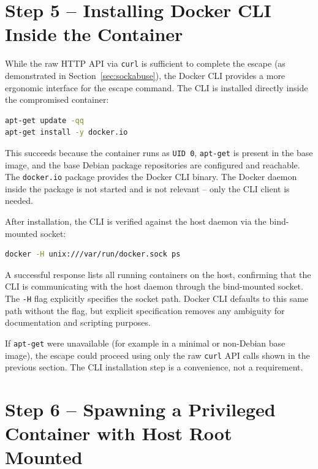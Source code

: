 \vspace{0.3cm}

\section{Step 5 -- Installing Docker CLI Inside the Container}

While the raw HTTP API via \texttt{curl} is sufficient to complete the escape (as demonstrated in Section~\ref{sec:sockabuse}), the Docker CLI provides a more ergonomic interface for the escape command. The CLI is installed directly inside the compromised container:

\begin{lstlisting}[language=bash]
apt-get update -qq
apt-get install -y docker.io
\end{lstlisting}

This succeeds because the container runs as \texttt{UID 0}, \texttt{apt-get} is present in the base image, and the base Debian package repositories are configured and reachable. The \texttt{docker.io} package provides the Docker CLI binary. The Docker daemon inside the package is not started and is not relevant -- only the CLI client is needed.

After installation, the CLI is verified against the host daemon via the bind-mounted socket:

\begin{lstlisting}[language=bash]
docker -H unix:///var/run/docker.sock ps
\end{lstlisting}

A successful response lists all running containers on the host, confirming that the CLI is communicating with the host daemon through the bind-mounted socket. The \texttt{-H} flag explicitly specifies the socket path. Docker CLI defaults to this same path without the flag, but explicit specification removes any ambiguity for documentation and scripting purposes.

If \texttt{apt-get} were unavailable (for example in a minimal or non-Debian base image), the escape could proceed using only the raw \texttt{curl} API calls shown in the previous section. The CLI installation step is a convenience, not a requirement.

\vspace{0.3cm}

\section{Step 6 -- Spawning a Privileged Container with Host Root Mounted}

